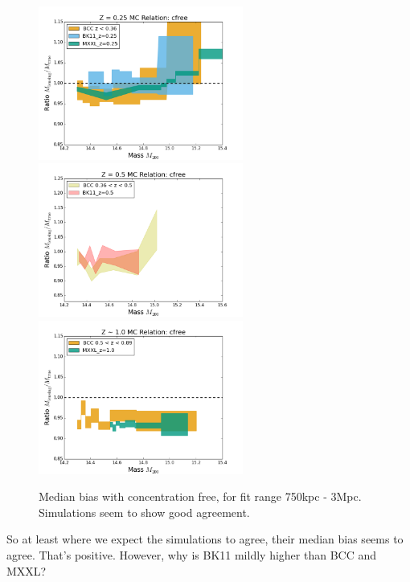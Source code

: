 \documentclass[11pt]{article}
\begin{document}
\begin{figure} \centering
\includegraphics[width=0.6\textwidth]{figures/cfree_z25.png} \\
\includegraphics[width=0.6\textwidth]{figures/cfree_z5.png} \\
\includegraphics[width=0.6\textwidth]{figures/cfree_z10.png}
\caption{Median bias with concentration free, for fit range 750kpc - 3Mpc. Simulations seem to show good agreement.}
\end{figure}

So at least where we expect the simulations to agree, their median bias seems to agree. 
That's positive.
However, why is BK11 mildly higher than BCC and MXXL?
\end{document}
